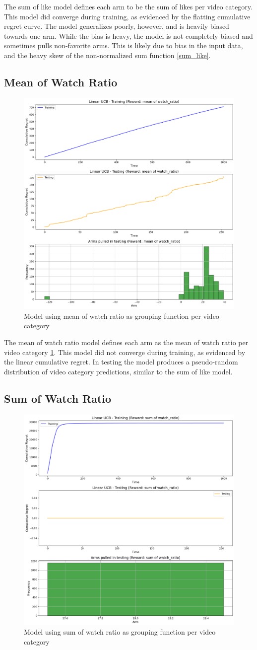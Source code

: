The sum of like model defines each arm to be the sum of likes per video category. This model did converge during training, as evidenced by the flatting cumulative regret curve. The model generalizes poorly, however, and is heavily biased towards one arm. While the bias is heavy, the model is not completely biased and sometimes pulls non-favorite arms. This is likely due to bias in the input data, and the heavy skew of the non-normalized sum function \ref{sum_like}.

\subsection{Mean of Watch Ratio}

\begin{figure}
    \centering
    \includegraphics[width=0.5\linewidth]{mean_watchratio.png}
    \caption{Model using mean of watch ratio as grouping function per video category}
    \label{mean_watchratio}
\end{figure}

The mean of watch ratio model defines each arm as the mean of watch ratio per video category \ref{mean_watchratio}. This model did not converge during training, as evidenced by the linear cumulative regret. In testing the model produces a pseudo-random distribution of video category predictions, similar to the sum of like model.

\subsection{Sum of Watch Ratio}

\begin{figure}
    \centering
    \includegraphics[width=0.5\linewidth]{summary_report/sum_watchratio.png}
    \caption{Model using sum of watch ratio as grouping function per video category}
    \label{sum_watchratio}
\end{figure}

